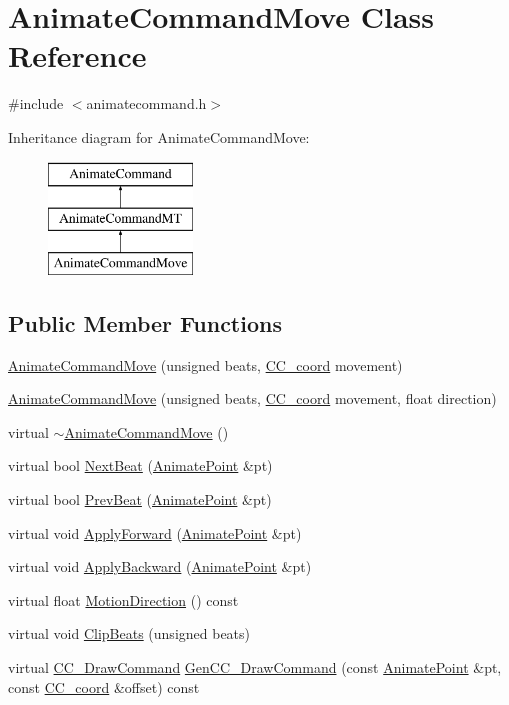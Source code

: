 \hypertarget{a00004}{\section{Animate\-Command\-Move Class Reference}
\label{a00004}
}


{\ttfamily \#include $<$animatecommand.\-h$>$}

Inheritance diagram for Animate\-Command\-Move\-:\begin{figure}[H]
\begin{center}
\leavevmode
\includegraphics[height=3.000000cm]{a00004}
\end{center}
\end{figure}
\subsection*{Public Member Functions}
\begin{DoxyCompactItemize}
\item 
\hyperlink{a00004_ab9ed9fbe25a224296fdd84996654751e}{Animate\-Command\-Move} (unsigned beats, \hyperlink{a00029}{C\-C\-\_\-coord} movement)
\item 
\hyperlink{a00004_aecd0d0f177c8e4f477b4f7c598317f1c}{Animate\-Command\-Move} (unsigned beats, \hyperlink{a00029}{C\-C\-\_\-coord} movement, float direction)
\item 
virtual \hyperlink{a00004_a76137e78b51f9f066ba1d451f65bec17}{$\sim$\-Animate\-Command\-Move} ()
\item 
virtual bool \hyperlink{a00004_aae66871bc335cfc08f1d843b0c070bd8}{Next\-Beat} (\hyperlink{a00196_a91212e6bb797b2b440819b6a9a86f702}{Animate\-Point} \&pt)
\item 
virtual bool \hyperlink{a00004_a0fc987b85dc91d4dc45663584d59f3b6}{Prev\-Beat} (\hyperlink{a00196_a91212e6bb797b2b440819b6a9a86f702}{Animate\-Point} \&pt)
\item 
virtual void \hyperlink{a00004_aca53b3ec977640ccce4765a5001d211b}{Apply\-Forward} (\hyperlink{a00196_a91212e6bb797b2b440819b6a9a86f702}{Animate\-Point} \&pt)
\item 
virtual void \hyperlink{a00004_a04bbf87bd1472184d5129d387b669db5}{Apply\-Backward} (\hyperlink{a00196_a91212e6bb797b2b440819b6a9a86f702}{Animate\-Point} \&pt)
\item 
virtual float \hyperlink{a00004_a76e50136a8930c4a0020371c45f447ab}{Motion\-Direction} () const 
\item 
virtual void \hyperlink{a00004_aecf325aaf810ee9fe14e39f86812b504}{Clip\-Beats} (unsigned beats)
\item 
virtual \hyperlink{a00031}{C\-C\-\_\-\-Draw\-Command} \hyperlink{a00004_aaa097d316852a0a16ec6d71942ecef4b}{Gen\-C\-C\-\_\-\-Draw\-Command} (const \hyperlink{a00196_a91212e6bb797b2b440819b6a9a86f702}{Animate\-Point} \&pt, const \hyperlink{a00029}{C\-C\-\_\-coord} \&offset) const 
\end{DoxyCompactItemize}

